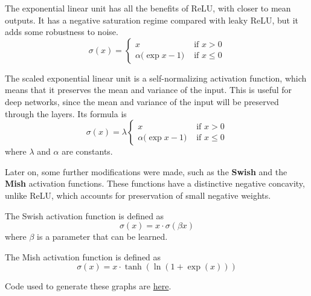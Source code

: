   \begin{definition}[ELU]
    The exponential linear unit has all the benefits of ReLU, with closer to mean outputs. It has a negative saturation regime compared with leaky ReLU, but it adds some robustness to noise. 
    \begin{equation}
      \sigma(x) = \begin{cases} x & \text{ if } x > 0 \\ \alpha \big(\exp{x} - 1 \big) & \text{ if } x \leq 0 \end{cases}
    \end{equation}
  \end{definition}

  \begin{definition}[SELU]
    The scaled exponential linear unit is a self-normalizing activation function, which means that it preserves the mean and variance of the input. This is useful for deep networks, since the mean and variance of the input will be preserved through the layers. Its formula is 
    \begin{equation}
      \sigma(x) = \lambda \begin{cases} x & \text{ if } x > 0 \\ \alpha \big(\exp{x} - 1 \big) & \text{ if } x \leq 0 \end{cases}
    \end{equation}
    where $\lambda$ and $\alpha$ are constants.
  \end{definition}
  
  Later on, some further modifications were made, such as the \textbf{Swish} and the \textbf{Mish} \cite{mish} activation functions. These functions have a distinctive negative concavity, unlike ReLU, which accounts for preservation of small negative weights.  

  \begin{definition}[Swish]
    The Swish activation function is defined as 
    \begin{equation}
      \sigma(x) = x \cdot \sigma(\beta x) 
    \end{equation}
    where $\beta$ is a parameter that can be learned. 
  \end{definition}

  \begin{definition}[Mish]
    The Mish activation function is defined as 
    \begin{equation}
      \sigma(x) = x \cdot \tanh(\ln(1 + \exp(x))) 
    \end{equation}
  \end{definition}

  \begin{code} 
    Code used to generate these graphs are \href{code/activation_functions.ipynb}{here}.
  \end{code} 

